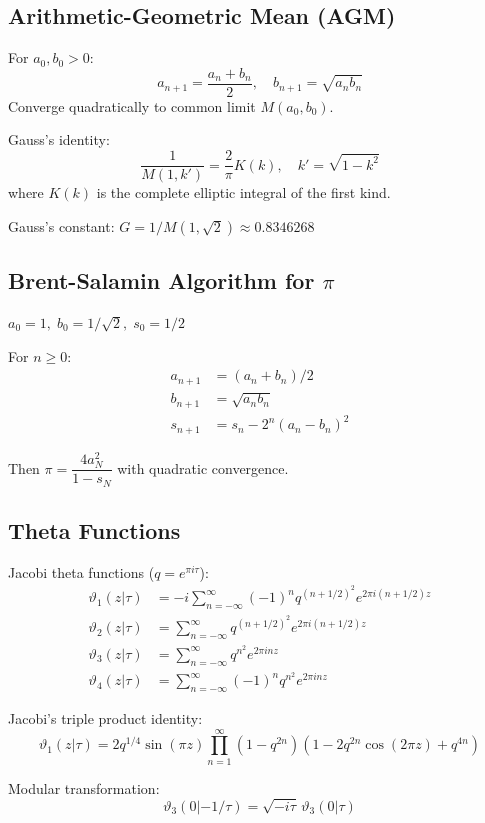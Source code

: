\subsection{Arithmetic-Geometric Mean (AGM)}

For $a_0, b_0 > 0$:
\[
a_{n+1} = \frac{a_n + b_n}{2}, \quad b_{n+1} = \sqrt{a_n b_n}
\]
Converge quadratically to common limit $M(a_0, b_0)$.

Gauss's identity:
\[
\frac{1}{M(1, k')} = \frac{2}{\pi} K(k), \quad k' = \sqrt{1-k^2}
\]
where $K(k)$ is the complete elliptic integral of the first kind.

Gauss's constant: $G = 1/M(1, \sqrt{2}) \approx 0.8346268$

\subsection{Brent-Salamin Algorithm for $\pi$}

$a_0 = 1,\; b_0 = 1/\sqrt{2},\; s_0 = 1/2$

For $n \ge 0$:
\begin{align*}
a_{n+1} &= (a_n + b_n)/2 \\
b_{n+1} &= \sqrt{a_n b_n} \\
s_{n+1} &= s_n - 2^n (a_n - b_n)^2
\end{align*}

Then $\pi = \dfrac{4 a_N^2}{1 - s_N}$ with quadratic convergence.

\subsection{Theta Functions}

Jacobi theta functions ($q = e^{\pi i \tau}$):
\begin{align*}
\vartheta_1(z|\tau) &= -i \sum_{n=-\infty}^{\infty} (-1)^n q^{(n+1/2)^2} e^{2\pi i (n+1/2)z} \\
\vartheta_2(z|\tau) &= \sum_{n=-\infty}^{\infty} q^{(n+1/2)^2} e^{2\pi i (n+1/2)z} \\
\vartheta_3(z|\tau) &= \sum_{n=-\infty}^{\infty} q^{n^2} e^{2\pi i n z} \\
\vartheta_4(z|\tau) &= \sum_{n=-\infty}^{\infty} (-1)^n q^{n^2} e^{2\pi i n z}
\end{align*}

Jacobi's triple product identity:
\[
\vartheta_1(z|\tau) = 2 q^{1/4} \sin(\pi z) \prod_{n=1}^{\infty} (1 - q^{2n})(1 - 2 q^{2n} \cos(2\pi z) + q^{4n})
\]

Modular transformation:
\[
\vartheta_3(0|-1/\tau) = \sqrt{-i\tau}\, \vartheta_3(0|\tau)
\]

